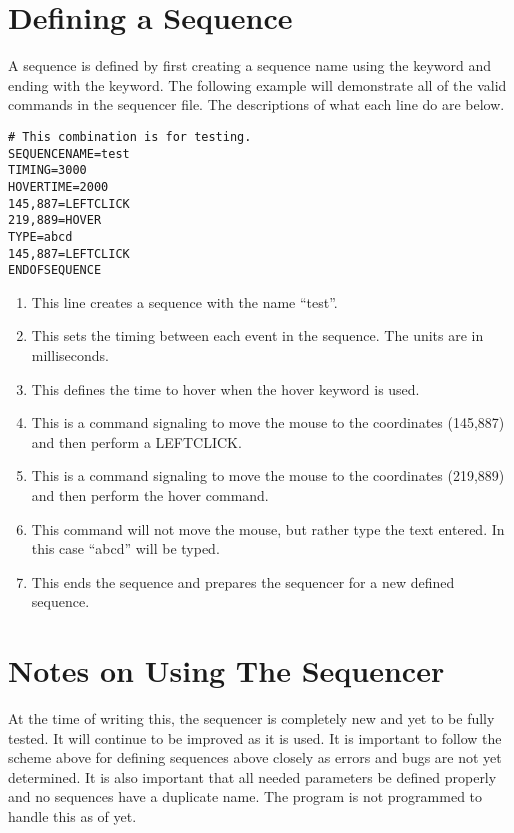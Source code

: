 \section{Defining a Sequence}

A sequence is defined by first creating a sequence name using the  keyword and ending with the  keyword. The following example will demonstrate all of the valid commands in the sequencer file. The descriptions of what each line do are below.

\begin{lstlisting}
# This combination is for testing.
SEQUENCENAME=test
TIMING=3000
HOVERTIME=2000
145,887=LEFTCLICK
219,889=HOVER
TYPE=abcd
145,887=LEFTCLICK
ENDOFSEQUENCE
\end{lstlisting}

\begin{enumerate}
	\item {} This line creates a sequence with the name ``test''.
	\item {} This sets the timing between each event in the sequence. The units are in milliseconds.
	\item {} This defines the time to hover when the hover keyword is used.
	\item {} This is a command signaling to move the mouse to the coordinates (145,887) and then perform a LEFTCLICK.
	\item {} This is a command signaling to move the mouse to the coordinates (219,889) and then perform the hover command.
	\item {} This command will not move the mouse, but rather type the text entered. In this case ``abcd'' will be typed.
	\item {} This ends the sequence and prepares the sequencer for a new defined sequence.
\end{enumerate}

\section{Notes on Using The Sequencer}

At the time of writing this, the sequencer is completely new and yet to be fully tested. It will continue to be improved as it is used. It is important to follow the scheme above for defining sequences above closely as errors and bugs are not yet determined. It is also important that all needed parameters be defined properly and no sequences have a duplicate name. The program is not programmed to handle this as of yet.